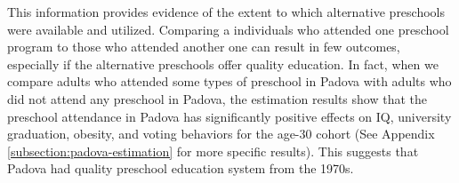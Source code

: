 This information provides evidence of the extent to which alternative preschools were available and utilized. Comparing a individuals who attended one preschool program to those who attended another one can result in few outcomes, especially if the alternative preschools offer quality education. In fact, when we compare adults who attended some types of preschool in Padova with adults who did not attend any preschool in Padova, the estimation results show that the preschool attendance in Padova has significantly positive effects on IQ, university graduation, obesity, and voting behaviors for the age-30 cohort (See Appendix \ref{subsection:padova-estimation} for more specific results). This suggests that Padova had quality preschool education system from the 1970s.